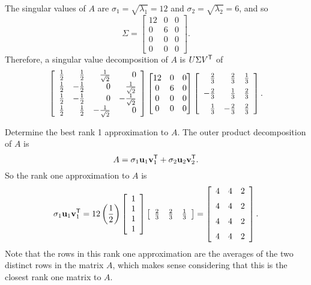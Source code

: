 \begin{example}
The singular values of $A$ are $\sigma_1 = \sqrt{\lambda_1} = 12$ and $\sigma_2 = \sqrt{\lambda_2} = 6$, and so
\[\Sigma = \begin{bmatrix} 12&0&0 \\ 0&6&0 \\0&0&0 \\ 0&0&0 \end{bmatrix}.\]
Therefore, a singular value decomposition of $A$ is $U \Sigma V^{\mathsf{T}}$ of
\[\left[ \begin{array}{crrr} \frac{1}{2} & \frac{1}{2} & \frac{1}{\sqrt{2}} & 0 \\ \frac{1}{2} & -\frac{1}{2} & 0 & \frac{1}{\sqrt{2}} \\  \frac{1}{2} & -\frac{1}{2} & 0 & -\frac{1}{\sqrt{2}} \\ \frac{1}{2} & \frac{1}{2} & -\frac{1}{\sqrt{2}} & 0 \\\end{array} \right] \begin{bmatrix} 12&0&0 \\ 0&6&0 \\0&0&0 \\ 0&0&0 \end{bmatrix} \left[ \begin {array}{rrc} \frac{2}{3}&\frac{2}{3}&\frac{1}{3}\\ \noalign{\medskip}-\frac{2}{3}&\frac{1}{3}&\frac{2}{3}\\ \noalign{\medskip} \frac{1}{3}&-\frac{2}{3}&\frac{2}{3}\end {array} \right].\]

\item Determine the best rank 1 approximation to $A$.  The outer product decomposition of $A$ is
\[A = \sigma_1 \mathbf{u}_1 \mathbf{v}_1^{\mathsf{T}} + \sigma_2 \mathbf{u}_2 \mathbf{v}_2^{\mathsf{T}}.\]
So the rank one approximation to $A$ is
\[ \sigma_1 \vu_1 \vv_1^{\tr} = 12 \left(\frac{1}{2}\right) \left[ \begin{array}{c} 1\\1\\1\\1\\ \end{array} \right] \left[ \begin{array}{ccc} \frac{2}{3} & \frac{2}{3} & \frac{1}{3} \end{array} \right] = \left[ \begin {array}{ccc} 4&4&2\\ \noalign{\medskip}4&4&2 \\ \noalign{\medskip}4&4&2\\ \noalign{\medskip}4&4&2\end {array}  \right].\]
Note that the rows in this rank one approximation are the averages of the two distinct rows in the matrix $A$, which makes sense considering that this is the closest rank one matrix to $A$.
    \ea


\end{example}



